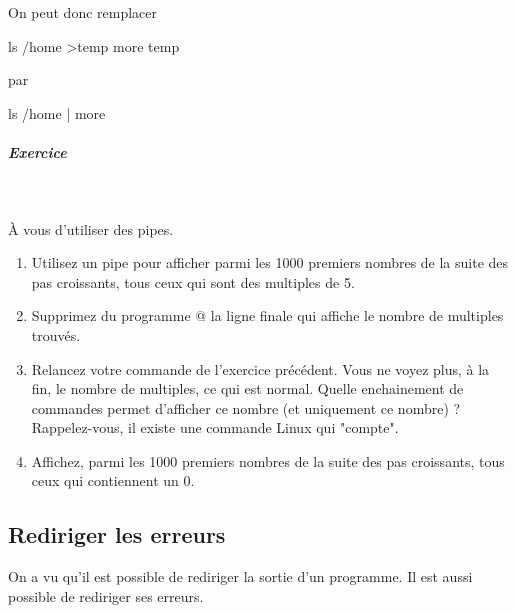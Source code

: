 \documentclass[11pt,a4paper]{article}
\begin{document}
            \par
        
					On peut donc remplacer
				
            \par
        \begin{Java}
					ls /home >temp
					more temp
				\end{Java}
					par
				
            \par
        \begin{Java}
					ls /home | more
				\end{Java}
			
		\subparagraph{Exercice} 
		
					\textcolor{white}{.} \par
				
            \par
        
				\`A vous d'utiliser des pipes.
				
					\begin{enumerate}
				
			\item 
						Utilisez un pipe pour afficher
						parmi les 1000 premiers nombres 
						de la suite des pas croissants,
						tous ceux qui sont des multiples de 5.
					
			\item 
						Supprimez du programme
						@
						la ligne finale qui affiche 
						le nombre de multiples trouv\'es. 
					
			\item 
						Relancez votre commande de l'exercice pr\'ec\'edent.
						Vous ne voyez plus, \`a la fin,
						le nombre de multiples, ce qui est normal.
						Quelle enchainement de commandes
						permet d'afficher ce nombre
						(et uniquement ce nombre) ?
						Rappelez-vous,
						il existe une commande Linux qui "compte". 
					
			\item 
						Affichez,
						parmi les 1000 premiers nombres 
						de la suite des pas croissants,
						tous ceux qui contiennent un 0.
					
					\end{enumerate}
				\subsection{Rediriger les erreurs}
					On a vu qu'il est possible de rediriger
					la sortie d'un programme.
					Il est aussi possible de rediriger ses erreurs.
				
\end{document}
